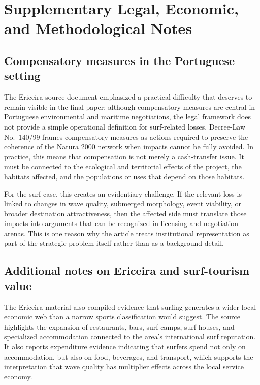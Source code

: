 \appendix

\section{Supplementary Legal, Economic, and Methodological Notes}
\label{sec_appendix}

\subsection{Compensatory measures in the Portuguese setting}

The Ericeira source document emphasized a practical difficulty that deserves to remain visible in the final paper: although compensatory measures are central in Portuguese environmental and maritime negotiations, the legal framework does not provide a simple operational definition for surf-related losses. Decree-Law No.\ 140/99 frames compensatory measures as actions required to preserve the coherence of the Natura 2000 network when impacts cannot be fully avoided. In practice, this means that compensation is not merely a cash-transfer issue. It must be connected to the ecological and territorial effects of the project, the habitats affected, and the populations or uses that depend on those habitats.

For the surf case, this creates an evidentiary challenge. If the relevant loss is linked to changes in wave quality, submerged morphology, event viability, or broader destination attractiveness, then the affected side must translate those impacts into arguments that can be recognized in licensing and negotiation arenas. This is one reason why the article treats institutional representation as part of the strategic problem itself rather than as a background detail.

\subsection{Additional notes on Ericeira and surf-tourism value}

The Ericeira material also compiled evidence that surfing generates a wider local economic web than a narrow sports classification would suggest. The source highlights the expansion of restaurants, bars, surf camps, surf houses, and specialized accommodation connected to the area's international surf reputation. It also reports expenditure evidence indicating that surfers spend not only on accommodation, but also on food, beverages, and transport, which supports the interpretation that wave quality has multiplier effects across the local service economy.

